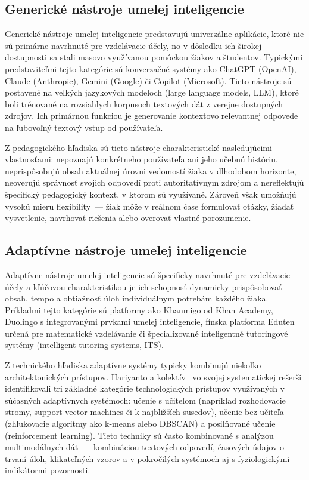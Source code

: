 \subsection{Generické nástroje umelej inteligencie}

Generické nástroje umelej inteligencie predstavujú univerzálne aplikácie, ktoré nie sú primárne navrhnuté pre vzdelávacie účely, no v dôsledku ich širokej dostupnosti sa stali masovo využívanou pomôckou žiakov a študentov. Typickými predstaviteľmi tejto kategórie sú konverzačné systémy ako ChatGPT (OpenAI), Claude (Anthropic), Gemini (Google) či Copilot (Microsoft). Tieto nástroje sú postavené na veľkých jazykových modeloch (large language models, LLM), ktoré boli trénované na rozsiahlych korpusoch textových dát z verejne dostupných zdrojov. Ich primárnou funkciou je generovanie kontextovo relevantnej odpovede na ľubovoľný textový vstup od používateľa.

Z pedagogického hľadiska sú tieto nástroje charakteristické nasledujúcimi vlastnosťami: nepoznajú konkrétneho používateľa ani jeho učebnú históriu, neprispôsobujú obsah aktuálnej úrovni vedomostí žiaka v dlhodobom horizonte, neoverujú správnosť svojich odpovedí proti autoritatívnym zdrojom a nereflektujú špecifický pedagogický kontext, v ktorom sú využívané. Zároveň však umožňujú vysokú mieru flexibility~--- žiak môže v reálnom čase formulovať otázky, žiadať vysvetlenie, navrhovať riešenia alebo overovať vlastné porozumenie.


\subsection{Adaptívne nástroje umelej inteligencie}

Adaptívne nástroje umelej inteligencie sú špecificky navrhnuté pre vzdelávacie účely a kľúčovou charakteristikou je ich schopnosť dynamicky prispôsobovať obsah, tempo a obtiažnosť úloh individuálnym potrebám každého žiaka. Príkladmi tejto kategórie sú platformy ako Khanmigo od Khan Academy, Duolingo s integrovanými prvkami umelej inteligencie, fínska platforma Eduten určená pre matematické vzdelávanie či špecializované inteligentné tutoringové systémy (intelligent tutoring systems, ITS).

Z technického hľadiska adaptívne systémy typicky kombinujú niekoľko architektonických prístupov. Hariyanto a kolektív~\cite{hariyanto2025adaptive} vo svojej systematickej rešerši identifikovali tri základné kategórie technologických prístupov využívaných v súčasných adaptívnych systémoch: učenie s učiteľom (napríklad rozhodovacie stromy, support vector machines či k-najbližších susedov), učenie bez učiteľa (zhlukovacie algoritmy ako k-means alebo DBSCAN) a posilňované učenie (reinforcement learning). Tieto techniky sú často kombinované s analýzou multimodálnych dát~--- kombináciou textových odpovedí, časových údajov o trvaní úloh, klikateľných vzorov a v pokročilých systémoch aj s fyziologickými indikátormi pozornosti.

